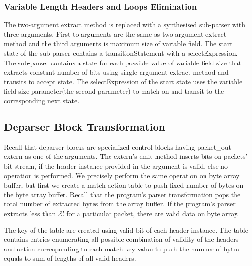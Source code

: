 \subsubsection{Variable Length Headers and Loops Elimination}
\label{variable-length-headers-loops-and-elimination}
The two-argument extract method is replaced with a synthesised sub-parser with three arguments.
First to arguments are the same as two-argument extract method and the third arguments is maximum size of variable field.
The start state of the sub-parser contains a transition\-Statement with a select\-Expression.
The sub-parser contains a state for each possible value of variable field size that extracts constant number of bits using single argument extract method and transits to accept state.
The select\-Expression of the start state uses the variable field size parameter(the second parameter) to match on and transit to the corresponding next state.




\subsection{Deparser Block Transformation}
\label{subsection:deparser-block-transformation}
Recall that deparser blocks are specialized control blocks having packet\_out extern as one of the arguments.
The extern's emit method inserts bits on packets' bit-stream, if the header instance provided in the argument is valid, else no operation is performed.
We precisely perform the same operation on byte array buffer, but first we create a match-action table to push fixed number of bytes on the byte array buffer.
Recall that the program's parser transformation pops the total number of extracted bytes from the array buffer.
If the program's parser extracts less than $\mathcal{E}l$ for a particular packet, there are valid data on byte array.

The key of the table are created using valid bit of each header instance.
The table contains entries enumerating all possible combination of validity of the headers and action corresponding to each match key value to push the number of bytes equals to sum of lengths of all valid headers.


